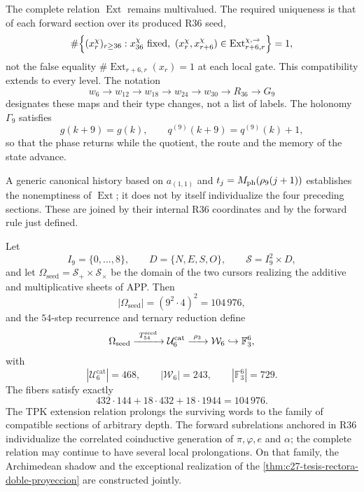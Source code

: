 The complete relation \(\operatorname{Ext}\) remains multivalued. The
required uniqueness is that of each forward section over its produced R36
seed,
\[
 \#\Bigl\{(x_r^\chi)_{r\ge36}:x_{36}^\chi\text{ fixed},\ 
 (x_r^\chi,x_{r+6}^\chi)
 \in\operatorname{Ext}^{\chi,\rightarrow}_{r+6,r}\Bigr\}=1,
\]
not the false equality \(\#\operatorname{Ext}_{r+6,r}(x_r)=1\) at each local
gate. This compatibility extends to every level. The notation
\[
 w_6\longrightarrow w_{12}\longrightarrow w_{18}\longrightarrow w_{24}
 \longrightarrow w_{30}\longrightarrow R_{36}\longrightarrow G_9
\]
designates these maps and their type changes, not a list of labels.
The holonomy \(\Gamma_9\) satisfies
\[
 g(k+9)=g(k),
 \qquad q^{(9)}(k+9)=q^{(9)}(k)+1,
\]
so that the phase returns while the quotient, the route and the
memory of the state advance.

A generic canonical history based on \(a_{(1,1)}\) and
\(t_j=M_{\rm ph}(\rho_9(j+1))\) establishes the nonemptiness of
\(\operatorname{Ext}\); it does not by itself individualize the four preceding
sections. These are joined by their internal R36 coordinates and by the
forward rule just defined.

\begin{theorem}
\label{thm:c27-construccion-inaugural-semillas}
Let
\[
 I_9=\{0,\ldots,8\},\qquad D=\{N,E,S,O\},\qquad
 \mathcal S=I_9^2\times D,
\]
and let \(\Omega_{\mathrm{seed}}=\mathcal S_+\times\mathcal S_\times\) be the
domain of the two cursors realizing the additive and multiplicative sheets
of APP. Then
\[
 |\Omega_{\mathrm{seed}}|=(9^2\cdot4)^2=104\,976,
\]
and the \(54\)-step recurrence and ternary reduction define
\[
 \Omega_{\mathrm{seed}}
 \xrightarrow{\ T_{54}^{\rm seed}\ }
 \mathcal U_6^{\mathrm{cat}}
 \xrightarrow{\ \rho_3\ }
 \mathcal W_6
 \hookrightarrow\mathbb F_3^6,
\]
with
\[
 |\mathcal U_6^{\mathrm{cat}}|=468,
 \qquad |\mathcal W_6|=243,
 \qquad |\mathbb F_3^6|=729.
\]
The fibers satisfy exactly
\[
 432\cdot144+18\cdot432+18\cdot1944=104\,976.
\]
The TPK extension relation prolongs the surviving words to the
family of compatible sections of arbitrary depth. The forward subrelations
anchored in R36 individualize the correlated coinductive generation
of \(\pi,\varphi,e\) and \(\alpha\); the complete relation may
continue to have several local prolongations. On that family, the
Archimedean shadow and the exceptional realization
of the \cref{thm:c27-tesis-rectora-doble-proyeccion} are constructed jointly.
\end{theorem}

